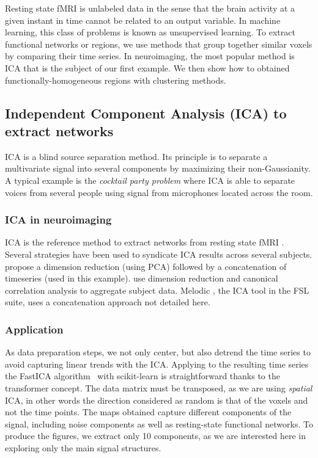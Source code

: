 \documentclass{frontiersSCNS} %
\begin{document}
Resting state fMRI is unlabeled data in the sense that the brain activity
at a given instant in time cannot be related to an output variable.
In machine learning, this class of problems is known as unsupervised
learning. 
To extract functional networks or regions, we use methods that group together 
similar voxels by comparing their time
series. In neuroimaging, the most popular method is ICA that
is the subject of our first example. We then show how to obtained 
functionally-homogeneous regions with
clustering methods.

\subsection{Independent Component Analysis (ICA) to extract networks}


ICA is a blind source separation method. Its principle is to separate a
multivariate signal into several components by maximizing their non-Gaussianity.
A typical example is the \emph{cocktail party problem} where ICA is able to separate
voices from several people using signal from microphones located across the room.

\subsubsection{ICA in neuroimaging}

ICA is the reference method to extract networks from resting state
fMRI \citep{kiviniemi2003}. Several strategies have been used to syndicate ICA
results across several subjects. \cite{calhoun2001a} propose a dimension
reduction (using PCA) followed by a concatenation of timeseries (used in this
example). \cite{varoquaux2010} use dimension reduction and canonical correlation analysis
to aggregate subject data. Melodic \citep{beckmann2004}, the ICA tool in
the FSL suite, uses a concatenation approach not detailed here.

\subsubsection{Application}

As data preparation steps, we not only center, but also detrend the time
series to avoid capturing linear trends with the ICA. Applying to the
resulting time series the FastICA algorithm~\citep{Hyvarinen:2000vk} with scikit-learn is
straightforward thanks to the transformer concept. The data matrix must
be transposed, as we are using \emph{spatial} ICA, in other words the
direction considered as random is that of the voxels and not the time
points. The maps obtained capture different components of the signal,
including noise components as well as resting-state functional networks.
To produce the figures, we extract only 10 components, as we are
interested here in exploring only the main signal structures.
\end{document}
